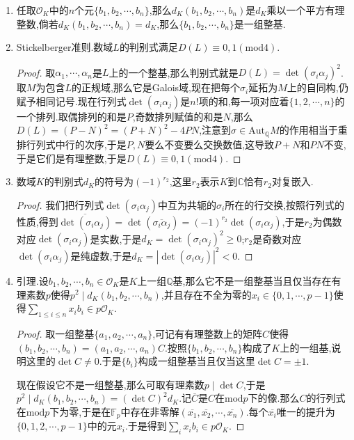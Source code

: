 \begin{enumerate}
	\item 任取$\mathscr{O}_K$中的$n$个元$\{b_1,b_2,\cdots,b_n\}$,那么$d_K(b_1,b_2,\cdots,b_n)$是$d_K$乘以一个平方有理整数,倘若$d_K(b_1,b_2,\cdots,b_n)=d_K$,那么$\{b_1,b_2,\cdots,b_n\}$是一组整基.
	\item Stickelberger准则.数域$L$的判别式满足$D(L)\equiv 0,1(\mathrm{mod} 4)$.
	\begin{proof}
		
		取$\alpha_1,\cdots,\alpha_n$是$L$上的一个整基,那么判别式就是$D(L)=\det(\sigma_i\alpha_j)^2$.取$M$为包含$L$的正规域,那么它是Galois域,现在把每个$\sigma_i$延拓为$M$上的自同构,仍赋予相同记号.现在行列式$\det(\sigma_i\alpha_j)$是$n!$项的和,每一项对应着$\{1,2,\cdots,n\}$的一个排列.取偶排列的和是$P$,奇数排列赋值的和是$N$,那么$D(L)=(P-N)^2=(P+N)^2-4PN$,注意到$\sigma\in\mathrm{Aut}_{\mathbb{Q}}M$的作用相当于重排行列式中行的次序,于是$P,N$要么不变要么交换数值,这导致$P+N$和$PN$不变,于是它们是有理整数,于是$D(L)\equiv 0,1(\mathrm{mod} 4)$.
	\end{proof}
    \item 数域$K$的判别式$d_K$的符号为$(-1)^{r_2}$,这里$r_2$表示$K$到$\mathbb{C}$恰有$r_2$对复嵌入.
    \begin{proof}
    	
    	我们把行列式$\det(\sigma_i\alpha_j)$中互为共轭的$\sigma_i$所在的行交换,按照行列式的性质,得到$\overline{\det(\sigma_i\alpha_j)}=\det(\overline{\sigma_i\alpha_j})=(-1)^{r_2}\det(\sigma_i\alpha_j)$,于是$r_2$为偶数对应$\det(\sigma_i\alpha_j)$是实数,于是$d_K=\det(\sigma_i\alpha_j)^2\ge0$;$r_2$是奇数对应$\det(\sigma_i\alpha_j)$是纯虚数,于是$d_K=|\det(\sigma_i\alpha_j)|^2<0$.
    \end{proof}
    \item 引理.设$b_1,b_2,\cdots,b_n\in\mathscr{O}_K$是$K$上一组$\mathbb{Q}$基,那么它不是一组整基当且仅当存在有理素数$p$使得$p^2\mid d_K(b_1,b_2,\cdots,b_n)$,并且存在不全为零的$x_i\in\{0,1,\cdots,p-1\}$使得$\sum_{1\le i\le n}x_ib_i\in p\mathscr{O}_K$.
    \begin{proof}
    	
    	取一组整基$\{a_1,a_2,\cdots,a_n\}$,可记有有理整数上的矩阵$C$使得$(b_1,b_2,\cdots,b_n)=(a_1,a_2,\cdots,a_n)C$.按照$\{b_1,b_2,\cdots,b_n\}$构成了$K$上的一组基,说明这里的$\det C\not=0$.于是$\{b_i\}$构成一组整基当且仅当这里$\det C=\pm1$.
    	
    	现在假设它不是一组整基,那么可取有理素数$p\mid\det C$,于是$p^2\mid d_K(b_1,b_2,\cdots,b_n)=(\det C)^2d_K$.记$\overline{C}$是$C$在$\mathrm{mod}p$下的像.那么$C$的行列式在$\mathrm{mod}p$下为零,于是在$\mathbb{F}_p$中存在非零解$(\overline{x_1},\overline{x_2},\cdots,\overline{x_n})$.每个$\overline{x_i}$唯一的提升为$\{0,1,2,\cdots,p-1\}$中的元$x_i$.于是得到$\sum_ix_ib_i\in p\mathscr{O}_K$.
    	

\end{proof}
\end{enumerate}
